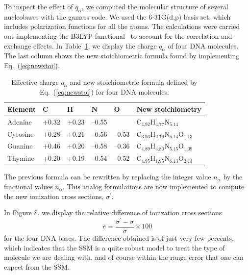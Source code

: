 \documentclass[preprint,12pt]{article}
\begin{document}
To inspect the effect of $q_{\alpha}$, we computed the molecular
structure of several nucleobases with the {\sc gamess} code. We 
used the 6-31G(d,p) basis set, which includes polarization 
functions for all the atoms. The calculations were carried out 
implementing the B3LYP functional~\cite{Becke1993,Stephens1994} to 
account for the correlation and exchange effects. 
In Table~\ref{tab:newstoi}, we display the charge $q_{\alpha}$ of four 
DNA molecules. The last column shows the new stoichiometric formula
found by implementing Eq.~(\ref{eq:newstoi}).
\begin{table}[H]
\begin{center}
\begin{tabular}{|p{}|p{}|p{}|p{
}|p{}|p{}|}
\hline
Element & C & H & N & O & New stoichiometry \\
\hline
Adenine & +0.32 & +0.23 & --0.55 &       & C$_{4.92}$H$_{4.77}$N$_{5.14}$ \\ 
\hline
Cytosine & +0.28 & +0.21 & --0.56 & --0.53 & C$_{3.93}$H$_{2.79}$N$_{5.14}$O$_{1.13}$ \\ 
\hline
Guanine & +0.46 & +0.20 & --0.58 & --0.36 & C$_{4.89}$H$_{4.80}$N$_{5.15}$O$_{1.09}$ \\ 
\hline
Thymine & +0.20 & +0.19 & --0.54 & --0.52 & C$_{4.95}$H$_{1.95}$N$_{6.13}$O$_{2.13}$ \\ 
\hline
\end{tabular}
\caption{Effective charge $q_{\alpha}$ and new stoichiometric formula 
defined by Eq.~(\ref{eq:newstoi}) for four DNA molecules.}
\label{tab:newstoi}
\end{center}
\end{table}

The previous formula can be rewritten by replacing the integer value 
$n_{\alpha}$ by the fractional values $n_{\alpha}^{\prime}$. This 
analog formulations are now implemented to compute the new ionization 
cross sections, $\sigma^{\prime}$.

In Figure 8, we display the relative difference of ionization cross 
sections 
\begin{equation}
e=\frac{\sigma^{\prime}-\sigma}{\sigma}\times 100
\label{120}
\end{equation}
for the four DNA bases. The difference obtained is of just very few 
percents, which indicates that the SSM is a quite robust model to treat 
the type of molecule we are dealing with, and of course within the 
range error that one can expect from the SSM.
\end{document}
